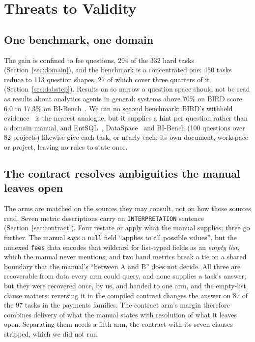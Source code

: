 \section{Threats to Validity}
\label{sec:threats}

\subsection{One benchmark, one domain}

The gain is confined to fee questions, 294 of the 332 hard tasks
(Section~\ref{sec:domain}), and the benchmark is a concentrated one: 450
tasks reduce to 113 question shapes, 27 of which cover three quarters of it
(Section~\ref{sec:dabstep}). Results on so narrow a question space should
not be read as results about analytics agents in general: systems above
70\% on BIRD score 6.0 to 17.3\% on BI-Bench~\cite{bi-bench}. We ran no second
benchmark; BIRD's withheld evidence~\cite{bird} is the nearest analogue,
but it supplies a hint per question rather than a domain manual, and
EntSQL~\cite{entsql}, DataSpace~\cite{dataspace} and BI-Bench (100
questions over 82 projects) likewise give each task, or nearly each, its
own document, workspace or project, leaving no rules to state once.

\subsection{The contract resolves ambiguities the manual leaves open}
\label{sec:interpretation}

The arms are matched on the sources they may consult, not on how those
sources read. Seven metric descriptions carry an \texttt{INTERPRETATION}
sentence (Section~\ref{sec:contract}). Four restate or apply what the manual
supplies; three go further. The manual says a \texttt{null} field ``applies
to all possible values'', but the annexed \texttt{fees} data encodes that
wildcard for list-typed fields as an \emph{empty list}, which the manual
never mentions, and two band metrics break a tie on a shared boundary that
the manual's ``between A and B'' does not decide. All three are recoverable
from data every arm could query, and none supplies a task's answer; but they
were recovered once, by us, and handed to one arm, and the empty-list clause
matters: reversing it in the compiled contract changes the answer on 87 of
the 97 tasks in the payments families. The contract arm's margin therefore
combines delivery of what the manual states with resolution of what it
leaves open. Separating them needs a fifth arm, the contract with its seven
clauses stripped, which we did not run.

